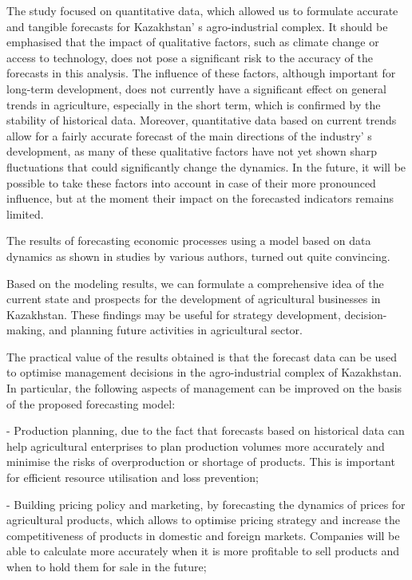 \begin{multicols}{2}

The study focused on quantitative data, which allowed us to formulate
accurate and tangible forecasts for Kazakhstan' s
agro-industrial complex. It should be emphasised that the impact of
qualitative factors, such as climate change or access to technology,
does not pose a significant risk to the accuracy of the forecasts in
this analysis. The influence of these factors, although important for
long-term development, does not currently have a significant effect on
general trends in agriculture, especially in the short term, which is
confirmed by the stability of historical data. Moreover, quantitative
data based on current trends allow for a fairly accurate forecast of the
main directions of the industry' s development, as many
of these qualitative factors have not yet shown sharp fluctuations that
could significantly change the dynamics. In the future, it will be
possible to take these factors into account in case of their more
pronounced influence, but at the moment their impact on the forecasted
indicators remains limited.

The results of forecasting economic processes using a model based on
data dynamics as shown in studies by various authors, turned out quite
convincing.

Based on the modeling results, we can formulate a comprehensive idea of
the current state and prospects for the development of agricultural
businesses in Kazakhstan. These findings may be useful for strategy
development, decision-making, and planning future activities in
agricultural sector.

The practical value of the results obtained is that the forecast data
can be used to optimise management decisions in the agro-industrial
complex of Kazakhstan. In particular, the following aspects of
management can be improved on the basis of the proposed forecasting
model:

- Production planning, due to the fact that forecasts based on
historical data can help agricultural enterprises to plan production
volumes more accurately and minimise the risks of overproduction or
shortage of products. This is important for efficient resource
utilisation and loss prevention;

- Building pricing policy and marketing, by forecasting the dynamics of
prices for agricultural products, which allows to optimise pricing
strategy and increase the competitiveness of products in domestic and
foreign markets. Companies will be able to calculate more accurately
when it is more profitable to sell products and when to hold them for
sale in the future;


\end{multicols}

